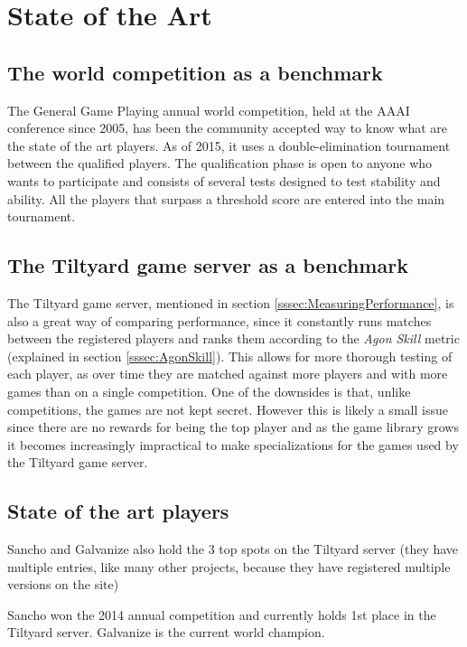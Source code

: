 
\chapter{State of the Art}
\label{chapter:state_of_the_art}

\section{The world competition as a benchmark}
The General Game Playing annual world competition, held at the AAAI conference since 2005, has been the community accepted way to know what are the state of the art players. 
As of 2015, it uses a double-elimination tournament between the qualified players.
The qualification phase is open to anyone who wants to participate and consists of several tests designed to test stability and ability. All the players that surpass a threshold score are entered into the main tournament.


\section{The Tiltyard game server as a benchmark}

The Tiltyard game server, mentioned in section \ref{sssec:MeasuringPerformance}, is also a great way of comparing performance, since it constantly runs matches between the registered players and ranks them according to the \textit{Agon Skill} metric (explained in section \ref{sssec:AgonSkill}). This allows for more thorough testing of each player, as over time they are matched against more players and with more games than on a single competition. One of the downsides is that, unlike competitions, the games are not kept secret. However this is likely a small issue since there are no rewards for being the top player and as the game library grows it becomes increasingly impractical to make specializations for the games used by the Tiltyard game server.

\section{State of the art players}

Sancho and Galvanize also hold the 3 top spots on the Tiltyard server (they have multiple entries, like many other projects, because they have registered multiple versions on the site)

Sancho won the 2014 annual competition and currently holds 1st place in the Tiltyard server.
Galvanize is the current world champion.


